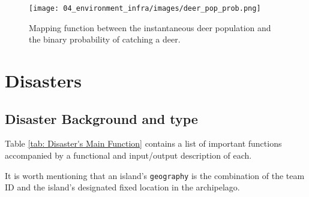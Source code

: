 \begin{figure}[!htb]
    \centering
    \texttt{[image: 04\_environment\_infra/images/deer\_pop\_prob.png]}
    \caption{Mapping function between the instantaneous deer population and the binary probability of catching a deer.}
    \label{fig:Foraging Mapping}
\end{figure}



\newpage
\section{Disasters}
\subsection{Disaster Background and type}

Table \ref{tab: Disaster's Main Function} contains a list of important functions accompanied by a functional and input/output description of each.

It is worth mentioning that an island's \texttt{geography} is the combination of the team ID and the island’s designated fixed location in the archipelago.

